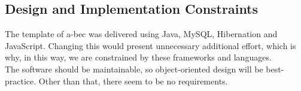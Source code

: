 \subsection{Design and Implementation Constraints}
	The template of a-bec was delivered using Java, MySQL, Hibernation and JavaScript. Changing this would 
	present unnecessary additional effort, which is why, in this way, we are constrained by these frameworks and languages.\\
	The software should be maintainable, so object-oriented design will be best-practice.
	Other than that, there seem to be no requirements.